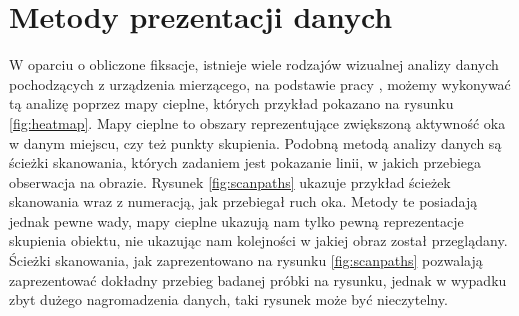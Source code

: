 \section{Metody prezentacji danych}
\label{sec:othereyetracking}
W oparciu o obliczone fiksacje, istnieje wiele rodzajów wizualnej analizy danych pochodzących z urządzenia mierzącego, na podstawie pracy \cite[rozdział 2.2]{OtherEyetrack}, możemy wykonywać tą analizę poprzez mapy cieplne, których przykład pokazano na rysunku \ref{fig:heatmap}. Mapy cieplne to obszary reprezentujące zwiększoną aktywność oka w danym miejscu, czy też punkty skupienia. Podobną metodą analizy danych są ścieżki skanowania, których zadaniem jest pokazanie linii, w jakich przebiega obserwacja na obrazie. Rysunek \ref{fig:scanpaths} ukazuje przykład ścieżek skanowania wraz z numeracją, jak przebiegał ruch oka. Metody te posiadają jednak pewne wady, mapy cieplne ukazują nam tylko pewną reprezentacje skupienia obiektu, nie ukazując nam kolejności w jakiej obraz został przeglądany. Ścieżki skanowania, jak zaprezentowano na rysunku \ref{fig:scanpaths} pozwalają zaprezentować dokładny przebieg badanej próbki na rysunku, jednak w wypadku zbyt dużego nagromadzenia danych, taki rysunek może być nieczytelny.

